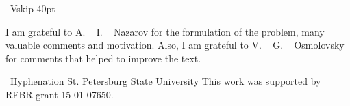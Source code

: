 \ Vskip 40pt

I am grateful to A. ~ I. ~ Nazarov for the formulation of the problem, many valuable comments and motivation.
Also, I am grateful to V. ~ G. ~ Osmolovsky for comments that helped to improve the text.

\ Hyphenation {} St. Petersburg State University
This work was supported by RFBR grant 15-01-07650.